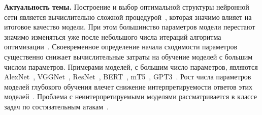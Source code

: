\textbf{Актуальность темы.}
Построение и выбор оптимальной структуры нейронной сети является вычислительно сложной процедурой~\cite{sutskever2014}, которая значимо влияет на итоговое качество модели. 
При этом большинство параметров модели перестают значимо изменяться уже после небольшого числа итераций алгоритма оптимизации~\cite{Chunyan2016}.
Своевременное определение начала сходимости параметров существенно снижает вычислительные затраты на обучение моделей с большим числом параметров.
Примерами моделей, с большим число параметров, являются AlexNet~\cite{Krizhevsky2012}, VGGNet~\cite{Simonyan2014}, ResNet~\cite{Kaiming2015}, BERT~\cite{Devlin2018, Vaswani2017}, mT5~\cite{Linting2021}, GPT3~\cite{Brown2020}.
Рост числа параметров моделей глубокого обучения влечет снижение интерпретируемости ответов этих моделей~\cite{Ivakhnenko1994}.
Проблема с неинтерпретируемыми моделями рассматривается в классе задач по состязательным атакам~\cite{Zheng2020}.

